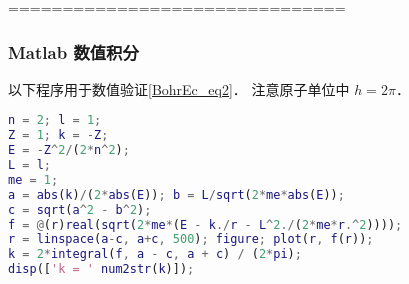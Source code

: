 ===============================

\subsubsection{Matlab 数值积分}
以下程序用于数值验证\autoref{BohrEc_eq2}． 注意原子单位中 $h = 2\pi$．
\begin{lstlisting}[language=matlab]
n = 2; l = 1;
Z = 1; k = -Z;
E = -Z^2/(2*n^2);
L = l;
me = 1;
a = abs(k)/(2*abs(E)); b = L/sqrt(2*me*abs(E));
c = sqrt(a^2 - b^2);
f = @(r)real(sqrt(2*me*(E - k./r - L^2./(2*me*r.^2))));
r = linspace(a-c, a+c, 500); figure; plot(r, f(r));
k = 2*integral(f, a - c, a + c) / (2*pi);
disp(['k = ' num2str(k)]);
\end{lstlisting}
